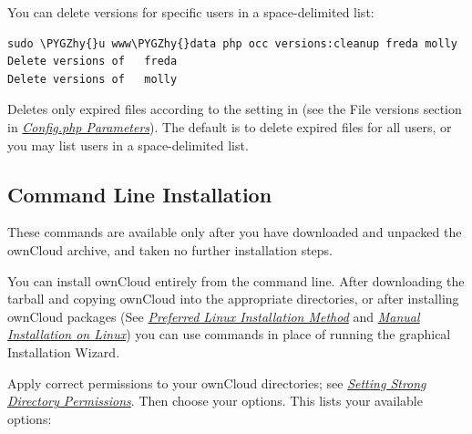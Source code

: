 \documentclass[letterpaper,10pt,english]{sphinxmanual}
\def\PYGZhy{\char`\-}
\begin{document}
You can delete versions for specific users in a space-delimited list:

\begin{Verbatim}[commandchars=\\\{\}]
sudo \PYGZhy{}u www\PYGZhy{}data php occ versions:cleanup freda molly
Delete versions of   freda
Delete versions of   molly
\end{Verbatim}

 Deletes only expired files according to the  setting in  (see the File versions section in {\hyperref[configuration_server/config_sample_php_parameters::doc]{\emph{\emph{Config.php Parameters}}}}). The default is to delete expired files for all users, or you may list users in a space-delimited list.


\subsection{Command Line Installation}
\label{configuration_server/occ_command:command-line-installation-label}\label{configuration_server/occ_command:command-line-installation}
These commands are available only after you have downloaded and unpacked the
ownCloud archive, and taken no further installation steps.

You can install ownCloud entirely from the command line. After downloading the
tarball and copying ownCloud into the appropriate directories, or
after installing ownCloud packages (See
{\hyperref[installation/linux_installation::doc]{\emph{\emph{Preferred Linux Installation Method}}}} and
{\hyperref[installation/source_installation::doc]{\emph{\emph{Manual Installation on Linux}}}}) you can use  commands in
place of running the graphical Installation Wizard.

Apply correct permissions to your ownCloud directories; see
{\hyperref[installation/installation_wizard:strong\string-perms\string-label]{\emph{Setting Strong Directory Permissions}}}. Then choose your  options. This lists your
available options:
\end{document}
